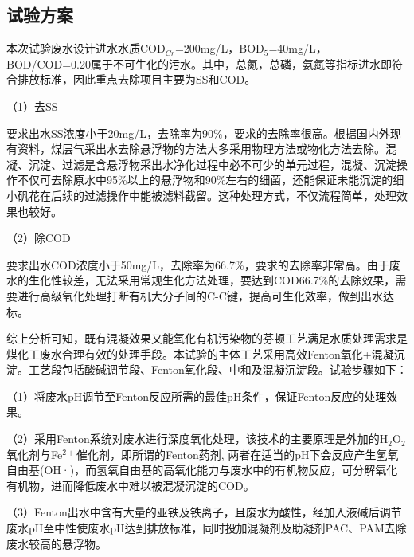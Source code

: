 \subsection{试验方案}
本次试验废水设计进水水质COD$_{Cr}$=200mg/L，BOD$_5$=40mg/L，BOD/COD=0.20属于不可生化的污水。其中，总氮，总磷，氨氮等指标进水即符合排放标准，因此重点去除项目主要为SS和COD。\par
（1）去SS\par
要求出水SS浓度小于20mg/L，去除率为90\%，要求的去除率很高。根据国内外现有资料，煤层气采出水去除悬浮物的方法大多采用物理方法或物化方法去除。混凝、沉淀、过滤是含悬浮物采出水净化过程中必不可少的单元过程，混凝、沉淀操作不仅可去除原水中95\%以上的悬浮物和90\%左右的细菌，还能保证未能沉淀的细小矾花在后续的过滤操作中能被滤料截留。这种处理方式，不仅流程简单，处理效果也较好。\par
（2）除COD\par
要求出水COD浓度小于50mg/L，去除率为66.7\%，要求的去除率非常高。由于废水的生化性较差，无法采用常规生化方法处理，要达到COD66.7\%的去除效果，需要进行高级氧化处理打断有机大分子间的C-C键，提高可生化效率，做到出水达标。\par
综上分析可知，既有混凝效果又能氧化有机污染物的芬顿工艺满足水质处理需求是煤化工废水合理有效的处理手段。本试验的主体工艺采用高效Fenton氧化+混凝沉淀。工艺段包括酸碱调节段、Fenton氧化段、中和及混凝沉淀段。试验步骤如下：\par
（1）将废水pH调节至Fenton反应所需的最佳pH条件，保证Fenton反应的处理效果。\par
（2）采用Fenton系统对废水进行深度氧化处理，该技术的主要原理是外加的H$_2$O$_2$氧化剂与Fe$^{2+}$催化剂，即所谓的Fenton药剂, 两者在适当的pH下会反应产生氢氧自由基(OH·)，而氢氧自由基的高氧化能力与废水中的有机物反应，可分解氧化有机物，进而降低废水中难以被混凝沉淀的COD。\par
（3）Fenton出水中含有大量的亚铁及铁离子，且废水为酸性，经加入液碱后调节废水pH至中性使废水pH达到排放标准，同时投加混凝剂及助凝剂PAC、PAM去除废水较高的悬浮物。\par

